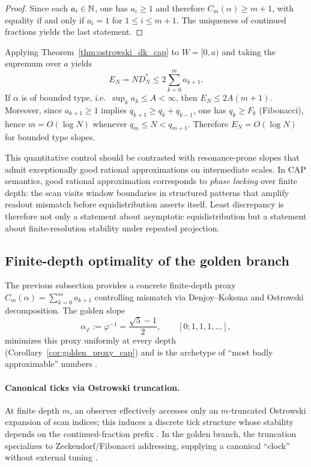 \begin{proof}
Since each $a_i\in\mathbb{N}$, one has $a_i\ge 1$ and therefore $C_m(\alpha)\ge m+1$, with equality if and only if $a_i=1$ for $1\le i\le m+1$.
The uniqueness of continued fractions yields the last statement.
\end{proof}

\begin{remark}
Applying Theorem~\ref{thm:ostrowski_dk_cap} to $W=[0,a)$ and taking the supremum over $a$ yields
\begin{equation}
  E_N = N D_N^\ast \le 2\sum_{k=0}^m a_{k+1}.
\end{equation}
If $\alpha$ is of bounded type, i.e.\ $\sup_k a_k\le A<\infty$, then $E_N\le 2A(m+1)$.
Moreover, since $a_{k+1}\ge 1$ implies $q_{k+1}\ge q_k+q_{k-1}$, one has $q_k\ge F_k$ (Fibonacci), hence $m=O(\log N)$ whenever $q_m\le N<q_{m+1}$. Therefore $E_N=O(\log N)$ for bounded type slopes.
\end{remark}

This quantitative control should be contrasted with resonance-prone slopes that admit exceptionally good rational approximations on intermediate scales. In CAP semantics, good rational approximation corresponds to \emph{phase locking} over finite depth: the scan visits window boundaries in structured patterns that amplify readout mismatch before equidistribution asserts itself. Least discrepancy is therefore not only a statement about asymptotic equidistribution but a statement about finite-resolution stability under repeated projection.

\subsection{Finite-depth optimality of the golden branch}
\label{subsec:golden_optimality}

The previous subsection provides a concrete finite-depth proxy $C_m(\alpha)=\sum_{k=0}^m a_{k+1}$ controlling mismatch via Denjoy--Koksma and Ostrowski decomposition. The golden slope
\begin{equation}
  \alpha_{\varphi} := \varphi^{-1} = \frac{\sqrt{5}-1}{2},
  \qquad
  [0;1,1,1,\dots],
\end{equation}
minimizes this proxy uniformly at every depth (Corollary~\ref{cor:golden_proxy_cap}) and is the archetype of ``most badly approximable'' numbers \cite{Cassels1957}.

\paragraph{Canonical ticks via Ostrowski truncation.}
At finite depth $m$, an observer effectively accesses only an $m$-truncated Ostrowski expansion of scan indices; this induces a discrete tick structure whose stability depends on the continued-fraction prefix \cite{AlloucheShallit2003,Lothaire2002}. In the golden branch, the truncation specializes to Zeckendorf/Fibonacci addressing, supplying a canonical ``clock'' without external tuning \cite{Zeckendorf1972}.

